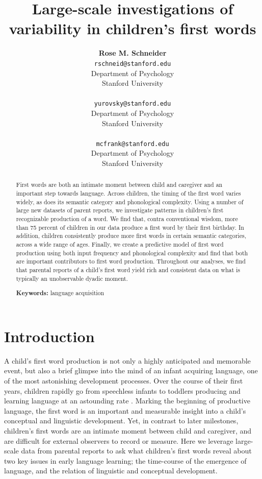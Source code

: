 \documentclass[10pt,letterpaper]{article}
\title{Large-scale investigations of variability in children's first words}
\author{{\large \bf Rose M. Schneider} \\ \texttt{rschneid@stanford.edu}\\ Department of Psychology \\ Stanford University \\ 
\And {\large \bf Daniel Yurovsky} \\ \texttt{yurovsky@stanford.edu} \\ Department of Psychology \\ Stanford University \\ 
\And {\large \bf Michael C. Frank} \\ \texttt{mcfrank@stanford.edu} \\ Department of Psychology \\ Stanford University \\ }
\begin{document}
\maketitle


\begin{abstract}
First words are both an intimate moment between child and caregiver and an important step towards language. Across children, the timing of the first word varies widely, as does its semantic category and phonological complexity. Using a number of large new datasets of parent reports, we investigate patterns in children's first recognizable production of a word. We find that, contra conventional wisdom, more than 75 percent of children in our data produce a first word by their first birthday. In addition, children consistently produce more first words in certain semantic categories, across a wide range of ages. Finally, we create a predictive model of first word production using both input frequency and phonological complexity and find that both are important contributors to first word production. Throughout our analyses, we find that parental reports of a child's first word yield rich and consistent data on what is typically an unobservable dyadic moment. 


\textbf{Keywords:}
language acquisition
\end{abstract}

\section{Introduction}

A child's first word production is not only a highly anticipated and memorable event, but also a brief glimpse into the mind of an infant acquiring language, one of the most astonishing development processes. Over the course of their first years, children rapidly go from speechless infants to toddlers producing and learning language at an astounding rate \cite{fenson1994,bloom2002}. Marking the beginning of productive language, the first word is an important and measurable insight into a child's conceptual and linguistic development. Yet, in contrast to later milestones, children's first words are an intimate moment between child and caregiver, and are difficult for external observers to record or measure. Here we leverage large-scale data from parental reports to ask what children's first words reveal about two key issues in early language learning; the time-course of the emergence of language, and the relation of linguistic and conceptual development. 
\end{document}
